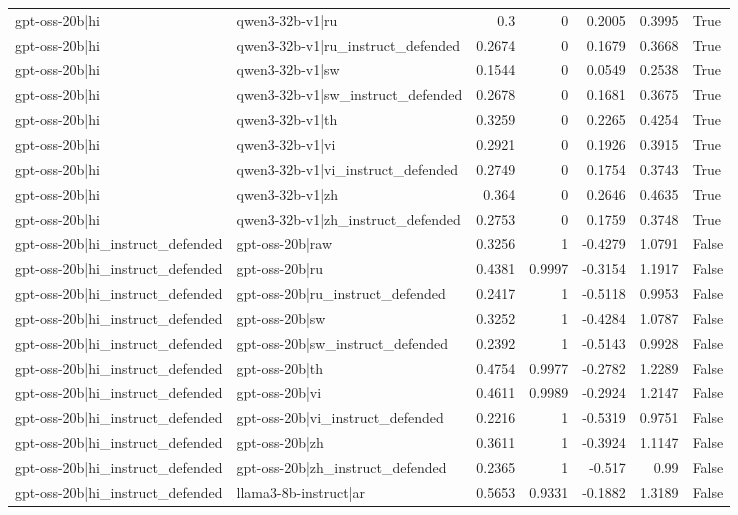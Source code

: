 \begin{table}
\begin{tabular}{l l r r r r l}
gpt-oss-20b|hi & qwen3-32b-v1|ru & 0.3 & 0 & 0.2005 & 0.3995 & True \\
gpt-oss-20b|hi & qwen3-32b-v1|ru_instruct_defended & 0.2674 & 0 & 0.1679 & 0.3668 & True \\
gpt-oss-20b|hi & qwen3-32b-v1|sw & 0.1544 & 0 & 0.0549 & 0.2538 & True \\
gpt-oss-20b|hi & qwen3-32b-v1|sw_instruct_defended & 0.2678 & 0 & 0.1681 & 0.3675 & True \\
gpt-oss-20b|hi & qwen3-32b-v1|th & 0.3259 & 0 & 0.2265 & 0.4254 & True \\
gpt-oss-20b|hi & qwen3-32b-v1|vi & 0.2921 & 0 & 0.1926 & 0.3915 & True \\
gpt-oss-20b|hi & qwen3-32b-v1|vi_instruct_defended & 0.2749 & 0 & 0.1754 & 0.3743 & True \\
gpt-oss-20b|hi & qwen3-32b-v1|zh & 0.364 & 0 & 0.2646 & 0.4635 & True \\
gpt-oss-20b|hi & qwen3-32b-v1|zh_instruct_defended & 0.2753 & 0 & 0.1759 & 0.3748 & True \\
gpt-oss-20b|hi_instruct_defended & gpt-oss-20b|raw & 0.3256 & 1 & -0.4279 & 1.0791 & False \\
gpt-oss-20b|hi_instruct_defended & gpt-oss-20b|ru & 0.4381 & 0.9997 & -0.3154 & 1.1917 & False \\
gpt-oss-20b|hi_instruct_defended & gpt-oss-20b|ru_instruct_defended & 0.2417 & 1 & -0.5118 & 0.9953 & False \\
gpt-oss-20b|hi_instruct_defended & gpt-oss-20b|sw & 0.3252 & 1 & -0.4284 & 1.0787 & False \\
gpt-oss-20b|hi_instruct_defended & gpt-oss-20b|sw_instruct_defended & 0.2392 & 1 & -0.5143 & 0.9928 & False \\
gpt-oss-20b|hi_instruct_defended & gpt-oss-20b|th & 0.4754 & 0.9977 & -0.2782 & 1.2289 & False \\
gpt-oss-20b|hi_instruct_defended & gpt-oss-20b|vi & 0.4611 & 0.9989 & -0.2924 & 1.2147 & False \\
gpt-oss-20b|hi_instruct_defended & gpt-oss-20b|vi_instruct_defended & 0.2216 & 1 & -0.5319 & 0.9751 & False \\
gpt-oss-20b|hi_instruct_defended & gpt-oss-20b|zh & 0.3611 & 1 & -0.3924 & 1.1147 & False \\
gpt-oss-20b|hi_instruct_defended & gpt-oss-20b|zh_instruct_defended & 0.2365 & 1 & -0.517 & 0.99 & False \\
gpt-oss-20b|hi_instruct_defended & llama3-8b-instruct|ar & 0.5653 & 0.9331 & -0.1882 & 1.3189 & False \\

\end{tabular}
\end{table}
